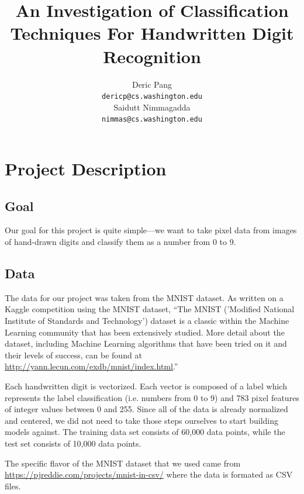\documentclass{article} %
\title{An Investigation of Classification Techniques For Handwritten Digit Recognition}
\author{
Deric Pang \\
\texttt{dericp@cs.washington.edu} \\
\And
Saidutt Nimmagadda \\
\texttt{nimmas@cs.washington.edu} \\
}
\begin{document}
\maketitle



\section{Project Description}
\subsection{Goal}

Our goal for this project is quite simple---we want to
take pixel data from images of hand-drawn digits
and classify them as a number from 0 to 9.

\subsection{Data}

The data for our project was taken from the MNIST dataset. As written on a
Kaggle competition using the MNIST dataset, ``The MNIST
('Modified National Institute of Standards and Technology') dataset
is a classic within the Machine Learning community that has been extensively
studied. More detail about the dataset, including Machine Learning algorithms
that have been tried on it and their levels of success, can be found at
\href{http://yann.lecun.com/exdb/mnist/index.html}{http://yann.lecun.com/exdb/mnist/index.html}.''

Each handwritten digit is vectorized. Each vector is composed of a label which
represents the label classification (i.e. numbers from 0 to 9) and 783 pixel
features of integer values between 0 and 255. Since all
of the data is already normalized and centered, we did not need to take those
steps ourselves to start building models against. The training data set
consists of 60,000 data points, while the test set consists of 10,000 data
points.

The specific flavor of the MNIST dataset that we used came from
\href{https://pjreddie.com/projects/mnist-in-csv/}{https://pjreddie.com/projects/mnist-in-csv/}
where the data is formated as CSV files.
\end{document}
